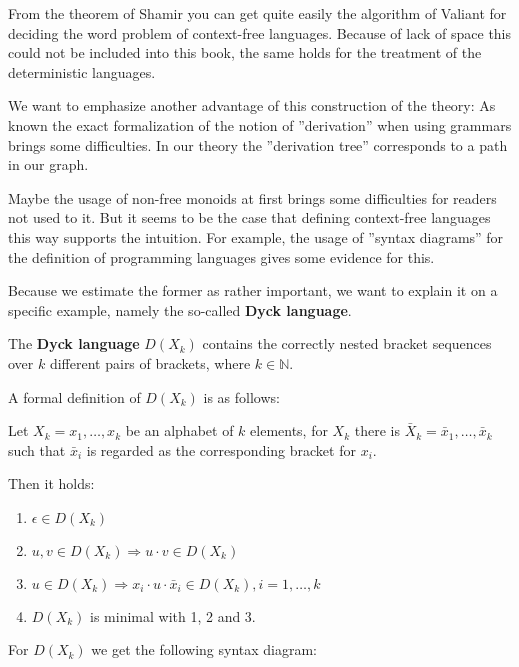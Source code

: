 From the theorem of Shamir you can get quite easily the algorithm of Valiant for
deciding the word problem of context-free languages. Because of lack of space
this could not be included into this book, the same holds for the treatment of
the  deterministic languages.

We want to emphasize another advantage of this construction of the theory: As
known the exact formalization of the notion of ''derivation'' when using
grammars brings some difficulties. In our theory the ''derivation tree''
corresponds to a path in our graph.

Maybe the usage of non-free monoids at first brings some difficulties for
readers not used to it. But it seems to be the case that defining context-free
languages this way supports the intuition. For example, the usage of ''syntax
diagrams'' for the definition of programming languages gives some evidence for
this.

Because we estimate the former as rather important, we want to explain it on a
specific example, namely the so-called {\bf Dyck language}.

\vspace{2ex}

The {\bf Dyck language} $D(X_k)$ contains the correctly nested bracket sequences
over $k$ different pairs of brackets, where $k \in \mathbb{N}$.

\vspace{2ex}

A formal definition of $D(X_k)$ is as follows:

Let $X_k = { x_1, \ldots, x_k}$ be an alphabet of $k$ elements, for $X_k$ there
is $\bar{X}_k = { \bar{x}_1, \ldots, \bar{x}_k}$ such that $\bar{x}_i$ is
regarded as the corresponding bracket for $x_i$.

Then it holds:

\begin{enumerate}
  \item $\epsilon \in D(X_k) $
  \item $u, v \in D(X_k) \Rightarrow u \cdot v \in D(X_k)$
  \item $u \in D(X_k) \Rightarrow x_i \cdot u \cdot \bar{x}_i \in D(X_k), i = 1,
  \ldots, k$
  \item $D(X_k)$ is minimal with 1, 2 and 3. 
\end{enumerate}

\vspace{2ex}

For $D(X_k)$ we get the following syntax diagram:

